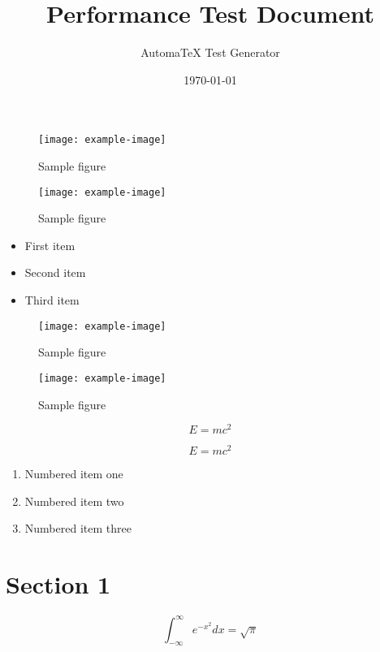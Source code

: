 \documentclass{article}
\title{Performance Test Document}
\author{AutomaTeX Test Generator}
\date{\today}
\begin{document}
\maketitle
\tableofcontents
\newpage

\begin{figure}[h]
    \centering
    \texttt{[image: example-image]}
    \caption{Sample figure}
    \label{fig:sample}
\end{figure}

\begin{figure}[h]
    \centering
    \texttt{[image: example-image]}
    \caption{Sample figure}
    \label{fig:sample}
\end{figure}


\begin{itemize}
\item First item
\item Second item
\item Third item
\end{itemize}

\begin{figure}[h]
    \centering
    \texttt{[image: example-image]}
    \caption{Sample figure}
    \label{fig:sample}
\end{figure}

\begin{figure}[h]
    \centering
    \texttt{[image: example-image]}
    \caption{Sample figure}
    \label{fig:sample}
\end{figure}

\begin{equation}
    E = mc^2
\end{equation}

\begin{equation}
    E = mc^2
\end{equation}


\begin{enumerate}
\item Numbered item one
\item Numbered item two
\item Numbered item three
\end{enumerate}

\section{Section 1}

\begin{equation}
    \int_{-\infty}^{\infty} e^{-x^2} dx = \sqrt{\pi}
\end{equation}
\end{document}
